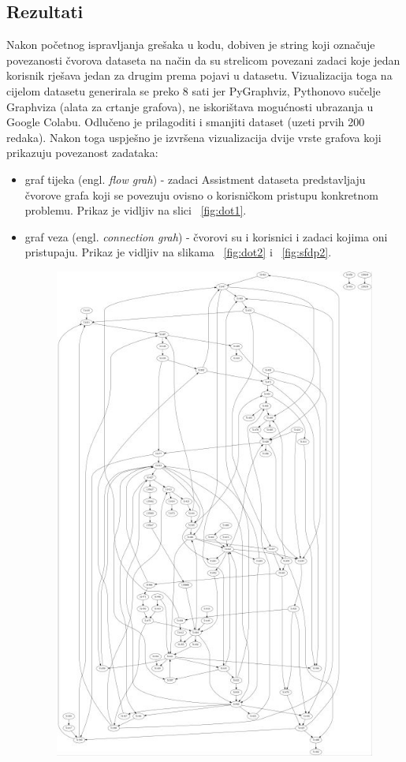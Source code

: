 \documentclass[times, utf8,projekt]{fer}
\begin{document}
\subsection{Rezultati}
Nakon početnog ispravljanja grešaka u kodu, dobiven je string koji označuje povezanosti čvorova dataseta na način da su strelicom povezani zadaci koje jedan korisnik rješava jedan za drugim prema pojavi u datasetu. Vizualizacija toga na cijelom datasetu generirala se preko 8 sati jer PyGraphviz, Pythonovo sučelje Graphviza (alata za crtanje grafova), ne iskorištava mogućnosti ubrazanja u Google Colabu. Odlučeno je prilagoditi i smanjiti dataset (uzeti prvih 200 redaka). Nakon toga uspješno je izvršena vizualizacija dvije vrste grafova koji prikazuju povezanost zadataka:
\begin{itemize}
\item graf tijeka (engl. \textit{flow grah}) - zadaci Assistment dataseta predstavljaju čvorove grafa koji se povezuju ovisno o korisničkom pristupu konkretnom problemu. Prikaz je vidljiv na slici ~\ref{fig:dot1}.
\item graf veza (engl. \textit{connection grah}) - čvorovi su i korisnici i zadaci kojima oni pristupaju. Prikaz je vidljiv na slikama ~\ref{fig:dot2} i ~\ref{fig:sfdp2}.
\begin{figure}[!htb]
\centering
\includegraphics[scale=0.5]{dot1.jpg}

\end{figure}
\end{itemize}
\end{document}
